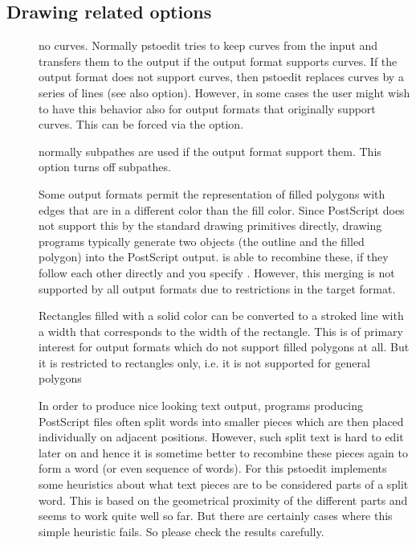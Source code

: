 \documentclass[english,a4paper]{article}
\begin{document}
\subsection{Drawing related options}
\begin{description}
\item[] 
no curves.  
Normally pstoedit tries to keep curves from the input and transfers them to the output if the output format supports curves. If the output format does not support curves, then pstoedit replaces curves by a series of lines (see also  option). However, in some cases the user might wish to have this behavior also for output formats that originally support curves. This can be forced via the  option. 


\item[] 
normally subpathes are used if the output format support them. This option turns off subpathes.


\item[] 
Some output formats permit the representation of filled polygons with edges that are in a different color than the fill color. Since PostScript does not support this by the standard drawing primitives directly, drawing programs typically generate two objects (the outline and the filled polygon) into the PostScript output.  is able to recombine these, if they follow each other directly and you specify . However, this merging is not supported by all output formats due to restrictions in the target format.


\item[] 
Rectangles filled with a solid color can be converted to a stroked line with a width that corresponds to the width of the rectangle. This is of primary interest for output formats which do not support filled polygons at all. But it is restricted to rectangles only, i.e. it is not supported for general polygons


\item[] 
In order to produce nice looking text output, programs producing PostScript files often split words into smaller pieces which are then placed individually on adjacent positions. However, such split text is hard to edit later on and hence it is sometime better to recombine these pieces again to form a word (or even sequence of words). For this pstoedit implements some heuristics about what text pieces are to be considered parts of a split word. This is based on the geometrical proximity of the different parts and seems to work quite well so far. But there are certainly cases where this simple heuristic fails. So please check the results carefully.



\end{description}
\end{document}
